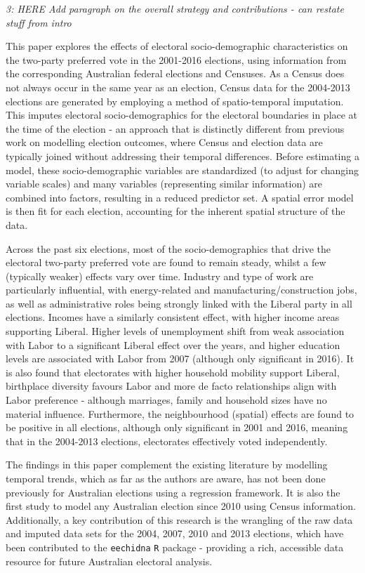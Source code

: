 \documentclass[11pt,a4paper,]{article}
\begin{document}
\emph{3: HERE Add paragraph on the overall strategy and contributions - can restate stuff from intro}

This paper explores the effects of electoral socio-demographic characteristics on the two-party preferred vote in the 2001-2016 elections, using information from the corresponding Australian federal elections and Censuses. As a Census does not always occur in the same year as an election, Census data for the 2004-2013 elections are generated by employing a method of spatio-temporal imputation. This imputes electoral socio-demographics for the electoral boundaries in place at the time of the election - an approach that is distinctly different from previous work on modelling election outcomes, where Census and election data are typically joined without addressing their temporal differences. Before estimating a model, these socio-demographic variables are standardized (to adjust for changing variable scales) and many variables (representing similar information) are combined into factors, resulting in a reduced predictor set. A spatial error model is then fit for each election, accounting for the inherent spatial structure of the data.

Across the past six elections, most of the socio-demographics that drive the electoral two-party preferred vote are found to remain steady, whilst a few (typically weaker) effects vary over time. Industry and type of work are particularly influential, with energy-related and manufacturing/construction jobs, as well as administrative roles being strongly linked with the Liberal party in all elections. Incomes have a similarly consistent effect, with higher income areas supporting Liberal. Higher levels of unemployment shift from weak association with Labor to a significant Liberal effect over the years, and higher education levels are associated with Labor from 2007 (although only significant in 2016). It is also found that electorates with higher household mobility support Liberal, birthplace diversity favours Labor and more de facto relationships align with Labor preference - although marriages, family and household sizes have no material influence. Furthermore, the neighbourhood (spatial) effects are found to be positive in all elections, although only significant in 2001 and 2016, meaning that in the 2004-2013 elections, electorates effectively voted independently.

The findings in this paper complement the existing literature by modelling temporal trends, which as far as the authors are aware, has not been done previously for Australian elections using a regression framework. It is also the first study to model any Australian election since 2010 using Census information. Additionally, a key contribution of this research is the wrangling of the raw data and imputed data sets for the 2004, 2007, 2010 and 2013 elections, which have been contributed to the \texttt{eechidna} \texttt{R} package - providing a rich, accessible data resource for future Australian electoral analysis.
\end{document}
